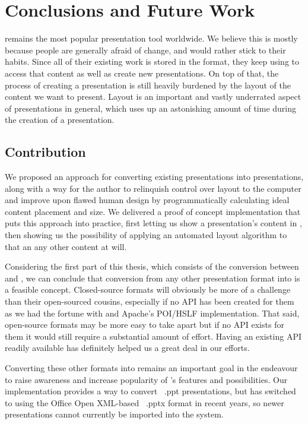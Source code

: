 
 \chapter{Conclusions and Future Work}

  \ppt* remains the most popular presentation tool worldwide. We believe this
  is mostly because people are generally afraid of change, and would rather
  stick to their habits. Since all of their existing work is stored in the \ppt
  format, they keep using \ppt to access that content as well as create new
  presentations. On top of that, the process of creating a presentation is
  still heavily burdened by the layout of the content we want to present.
  Layout is an important and vastly underrated aspect of presentations in
  general, which uses up an astonishing amount of time during the creation of a
  presentation.

  \section{Contribution}

   We proposed an approach for converting existing \ppt presentations into \mxp
   presentations, along with a way for the author to relinquish control over
   layout to the computer and improve upon flawed human design by
   programmatically calculating ideal content placement and size. We delivered
   a proof of concept implementation that puts this approach into practice,
   first letting us show a \ppt presentation's content in \mxp, then showing us
   the possibility of applying an automated layout algorithm to that an any
   other \mxp content at will.

   Considering the first part of this thesis, which consists of the conversion
   between \ppt and \mxp, we can conclude that conversion from any other
   presentation format into \mxp is a feasible concept. Closed-source formats
   will obviously be more of a challenge than their open-sourced cousins,
   especially if no API has been created for them as we had the fortune with
   \ppt and Apache's POI/HSLF implementation. That said, open-source formats
   may be more easy to take apart but if no API exists for them it would still
   require a substantial amount of effort. Having an existing API readily
   available has definitely helped us a great deal in our efforts.

   Converting these other formats into \mxp remains an important goal in the
   endeavour to raise awareness and increase popularity of \mxp's features and
   possibilities. Our implementation provides a way to convert \ppt\ .ppt
   presentations, but \ppt* has switched to using the Office Open XML-based
   \ .pptx format in recent years, so newer \ppt presentations cannot currently
   be imported into the \mxp system.

